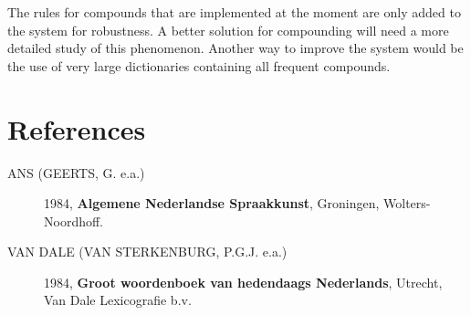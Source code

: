The rules for compounds that are implemented at the moment are only added to 
the system for robustness. A better solution for compounding will need a
more detailed study of this phenomenon. Another way to improve the system would
be the use of very large dictionaries containing all frequent compounds.

\newpage
\section{References}

\begin{description}
  \item [ANS (GEERTS, G. e.a.)]
     1984, {\bf Algemene Nederlandse Spraakkunst}, Groningen, Wolters-Noordhoff.

  \item [VAN DALE (VAN STERKENBURG, P.G.J. e.a.)]
     1984, {\bf Groot woordenboek van hedendaags Nederlands}, Utrecht, Van Dale 
           Lexicografie b.v.

\end{description}

